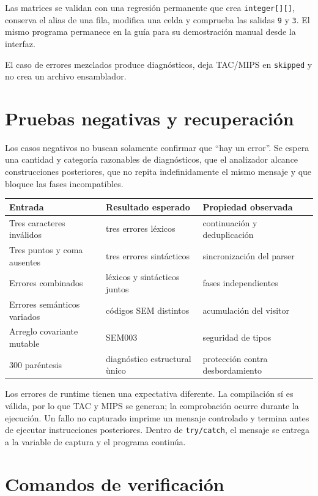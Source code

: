 \documentclass[11pt,letterpaper,oneside]{report}
\newcommand{\codigo}[1]{\texttt{#1}}
\begin{document}
Las matrices se validan con una regresi\'on permanente que crea \codigo{integer[][]}, conserva el alias de una fila, modifica una celda y comprueba las salidas \codigo{9} y \codigo{3}. El mismo programa permanece en la gu\'ia para su demostraci\'on manual desde la interfaz.

El caso de errores mezclados produce diagn\'osticos, deja TAC/MIPS en \codigo{skipped} y no crea un archivo ensamblador.

\section{Pruebas negativas y recuperaci\'on}

Los casos negativos no buscan solamente confirmar que ``hay un error''. Se espera una cantidad y categor\'ia razonables de diagn\'osticos, que el analizador alcance construcciones posteriores, que no repita indefinidamente el mismo mensaje y que bloquee las fases incompatibles.

\begin{longtable}{p{3.2cm}p{5.1cm}p{4.8cm}}
\toprule
Entrada & Resultado esperado & Propiedad observada\\\midrule
\endhead
Tres caracteres inv\'alidos & tres errores l\'exicos & continuaci\'on y deduplicaci\'on\\
Tres puntos y coma ausentes & tres errores sint\'acticos & sincronizaci\'on del parser\\
Errores combinados & l\'exicos y sint\'acticos juntos & fases independientes\\
Errores sem\'anticos variados & c\'odigos SEM distintos & acumulaci\'on del visitor\\
Arreglo covariante mutable & SEM003 & seguridad de tipos\\
300 par\'entesis & diagn\'ostico estructural \`unico & protecci\'on contra desbordamiento\\
\bottomrule
\end{longtable}

Los errores de runtime tienen una expectativa diferente. La compilaci\'on s\'i es v\'alida, por lo que TAC y MIPS se generan; la comprobaci\'on ocurre durante la ejecuci\'on. Un fallo no capturado imprime un mensaje controlado y termina antes de ejecutar instrucciones posteriores. Dentro de \codigo{try/catch}, el mensaje se entrega a la variable de captura y el programa contin\'ua.

\section{Comandos de verificaci\'on}
\end{document}
